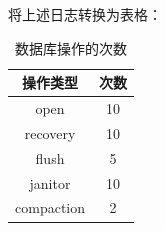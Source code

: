 	将上述日志转换为表格：

	\begin{table}[h!]
		\centering
		\begin{tabular}{|c|c|}
		\hline
		操作类型 & 次数 \\
		\hline
		open & 10 \\
		\hline
		recovery & 10 \\
		\hline
		flush & 5 \\
		\hline
		janitor & 10 \\
		\hline
		compaction & 2 \\
		\hline
		\end{tabular}
		\caption{数据库操作的次数}
		\label{tab:db}
	\end{table}
		
		




	
\clearpage